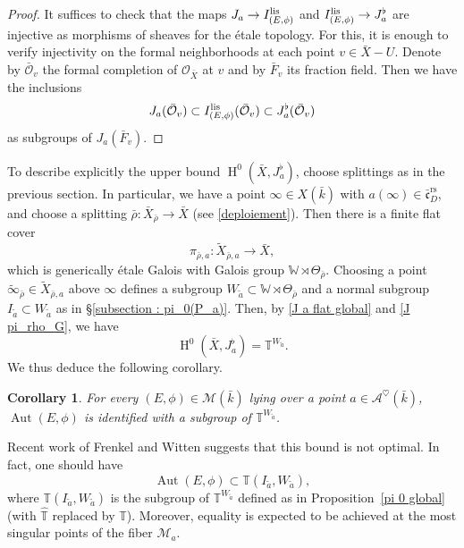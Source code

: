 \documentclass[12pt,english]{smfart}
\numberwithin{equation}{subsection}
\newtheorem{corollary}[equation]{Corollary}
\theoremstyle{remark}
\begin{document}
\begin{proof}
It suffices to check that the maps $J_a\rightarrow I_{(E,\phi)}^{\rm lis}$ and $I_{(E,\phi)}^{\rm lis}\rightarrow J_a^\flat$
are injective as morphisms of sheaves for the \'etale topology. For this, it is enough to verify injectivity on the formal neighborhoods at each point
$v\in\bar X-U$. Denote by $\bar{\mathcal{O}}_v$ the formal completion of $\mathcal{O}_{\bar X}$ at $v$
and by $\bar{F}_v$ its fraction field. Then we have the inclusions
$$
J_a(\bar{\mathcal{O}}_v)\subset I_{(E,\phi)}^{\rm lis}(\bar{\mathcal{O}}_v)\subset J_a^\flat(\bar{\mathcal{O}}_v)
$$
as subgroups of $J_a(\bar{F}_v)$.
\end{proof}

To describe explicitly the upper bound $\operatorname{H}^0(\bar{X},J_a^\flat)$, choose splittings as in the previous section.
In particular, we have a point $\infty\in X(\bar{k})$ with $a(\infty)\in \bar{\mathfrak{c}}_D^\mathrm{rs}$,
and choose a splitting $\bar{\rho}:\bar X_{\bar\rho}\rightarrow \bar X$ (see \ref{deploiement}). Then there is a finite flat cover
$$
\pi_{\bar\rho,a}:\widetilde X_{\bar\rho,a}\rightarrow \bar X,
$$
which is generically \'etale Galois with Galois group $\mathbb{W}\rtimes \Theta_{\bar\rho}$.
Choosing a point $\tilde\infty_{\bar\rho}\in \widetilde X_{\bar\rho,a}$ above $\infty$ defines a subgroup $W_{\tilde a}\subset \mathbb{W}\rtimes \Theta_{\bar\rho}$
and a normal subgroup $I_{\tilde a}\subset W_{\tilde a}$ as in \S\ref{subsection : pi_0(P_a)}.
Then, by \ref{J a flat global} and \ref{J pi_rho_G}, we have
$$
\operatorname{H}^0(\bar X,J_a^\flat)=\mathbb{T}^{W_{\tilde a}}.
$$
We thus deduce the following corollary.

\begin{corollary}
For every $(E,\phi)\in\mathcal{M}(\bar{k})$ lying over a point $a\in\mathcal{A}^\heartsuit(\bar{k})$, $\operatorname{Aut}(E,\phi)$ is identified with a subgroup of $\mathbb{T}^{W_{\tilde a}}$.
\end{corollary}

Recent work of Frenkel and Witten suggests that this bound is not optimal.
In fact, one should have
$$
\operatorname{Aut}(E,\phi)\subset \mathbb{T}(I_{\tilde a},W_{\tilde a}),
$$
where $\mathbb{T}(I_{\tilde a},W_{\tilde a})$ is the subgroup of $\mathbb{T}^{W_{\tilde a}}$ defined as in Proposition~\ref{pi 0 global}
(with $\hat{\mathbb{T}}$ replaced by $\mathbb{T}$). Moreover, equality is expected to be achieved
at the most singular points of the fiber $\mathcal{M}_a$.
\end{document}
